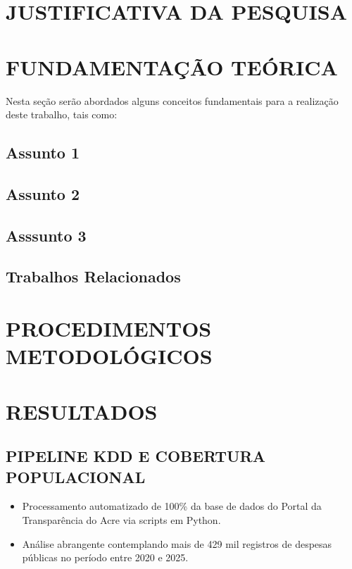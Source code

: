\documentclass[
    12pt,               %
    openright,          %
    oneside,            %
    a4paper,            %
    chapter=TITLE,      %
    sumario=tradicional,%
    english,            %
    brazilian,          %
 ]{abntex2}
\begin{document}
\chapter{JUSTIFICATIVA DA PESQUISA}\label{sec:justificativa}

\chapter{FUNDAMENTAÇÃO TEÓRICA}\label{sec:fundamentacao}
Nesta seção serão abordados alguns conceitos fundamentais para a realização deste trabalho, tais como: 

\section{Assunto 1}
\section{Assunto 2}
\section{Asssunto 3}
\section{Trabalhos Relacionados}\label{sec:TrabRel}

\chapter{PROCEDIMENTOS METODOLÓGICOS}

\chapter{RESULTADOS}\label{sec:resultados}

\section{PIPELINE KDD E COBERTURA POPULACIONAL}
\begin{itemize}
    \item Processamento automatizado de 100\% da base de dados do Portal da Transparência do Acre via scripts em Python.
    \item Análise abrangente contemplando mais de 429 mil registros de despesas públicas no período entre 2020 e 2025.
\end{itemize}
\end{document}
